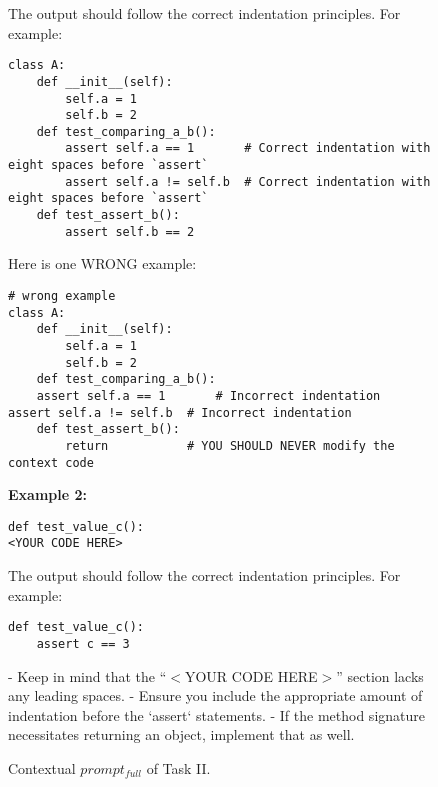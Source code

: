 \begin{figure}
\begin{tcolorbox}[colback=blue!5!white, colframe=blue!75!black]
The output should follow the correct indentation principles. For example:
\begin{verbatim}
class A:
    def __init__(self):
        self.a = 1
        self.b = 2
    def test_comparing_a_b():
        assert self.a == 1       # Correct indentation with eight spaces before `assert`
        assert self.a != self.b  # Correct indentation with eight spaces before `assert`
    def test_assert_b():
        assert self.b == 2
\end{verbatim}

Here is one WRONG example:
\begin{verbatim}
# wrong example
class A:
    def __init__(self):
        self.a = 1
        self.b = 2
    def test_comparing_a_b():
    assert self.a == 1       # Incorrect indentation
assert self.a != self.b  # Incorrect indentation
    def test_assert_b():
        return           # YOU SHOULD NEVER modify the context code
\end{verbatim}

\textbf{Example 2:}
\begin{verbatim}
def test_value_c():
<YOUR CODE HERE>
\end{verbatim}

The output should follow the correct indentation principles. For example:
\begin{verbatim}
def test_value_c():
    assert c == 3
\end{verbatim}

- Keep in mind that the ``$<$YOUR CODE HERE$>$'' section lacks any leading spaces. 
- Ensure you include the appropriate amount of indentation before the `assert` statements. 
- If the method signature necessitates returning an object, implement that as well.

\end{tcolorbox}

    \caption{Contextual $prompt_{full}$ of Task II.}
    \label{fig:task2prompt}
\end{figure}